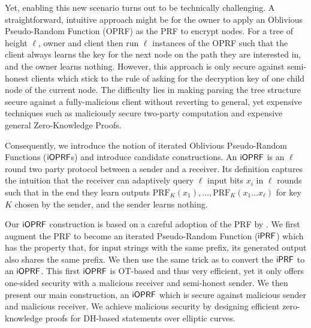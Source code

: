 Yet, enabling this new scenario turns out to be technically
challenging.  A straightforward, intuitive approach might be for the
owner to apply an Oblivious Pseudo-Random Function (OPRF) as the PRF
to encrypt nodes. For a tree of height $\ell$, owner and client then
run $\ell$ instances of the OPRF such that the client always learns
the key for the next node on the path they are interested in, and the
owner learns nothing. However, this approach is only secure against
semi-honest clients which stick to the rule of asking for the
decryption key of one child node of the current node. The difficulty
lies in making parsing the tree structure secure against a
fully-malicious client without reverting to general, yet expensive
techniques such as maliciously secure two-party computation and
expensive general Zero-Knowledge Proofs.

Consequently, we introduce the notion of iterated Oblivious
Pseudo-Random Functions ($\mathsf{i}\mathsf{OPRF}$s) and introduce candidate
constructions. An $\mathsf{i}\mathsf{OPRF}$ is an $\ell$ round two party protocol
between a sender and a receiver. Its definition captures the intuition
that the receiver can adaptively query $\ell$ input bits $x_i$ in
$\ell$ rounds such that in the end they learn outputs
$\text{PRF}_K(x_1),\ldots,\text{PRF}_K(x_1\ldots{}x_\ell)$ for key $K$
chosen by the sender, and the sender learns nothing.

Our $\mathsf{i}\mathsf{OPRF}$ construction is based on a careful adoption of the PRF by
\citet{prf}. We first augment the \citeauthor{prf} PRF to become an
iterated Pseudo-Random Function ($\mathsf{i}\mathsf{PRF}$) which has the property that,
for input strings with the same prefix, its generated output also
shares the same prefix. We then use the same trick as \citet{oprf} to
convert the $\mathsf{i}\mathsf{PRF}$ to an $\mathsf{i}\mathsf{OPRF}$. This first $\mathsf{i}\mathsf{OPRF}$ is OT-based
and thus very efficient, yet it only offers one-sided security with a
malicious receiver and semi-honest sender. We then present our main
construction, an $\mathsf{i}\mathsf{OPRF}$ which is secure against malicious sender and
malicious receiver. We achieve malicious security by designing
efficient zero-knowledge proofs for DH-based statements over elliptic
curves.

